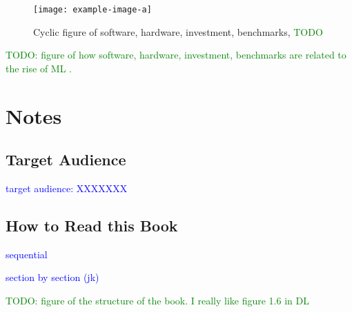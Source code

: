 \begin{figure}[htp]
	\centering
	\texttt{[image: example-image-a]}\hfil
	\caption{Cyclic figure of software, hardware, investment, benchmarks, \textcolor{green}{TODO}}
	\label{fig:cyclic_rise_of_dl_overview}
\end{figure}
\textcolor{green}{TODO: figure of how software, hardware, investment, benchmarks are related to the rise of ML .}



\section{Notes}

\subsection{Target Audience}
\textcolor{blue}{target audience: XXXXXXX}

\subsection{How to Read this Book}
\textcolor{blue}{sequential}

\textcolor{blue}{section by section (jk)}

\textcolor{green}{TODO: figure of the structure of the book. I really like figure 1.6 in DL}


